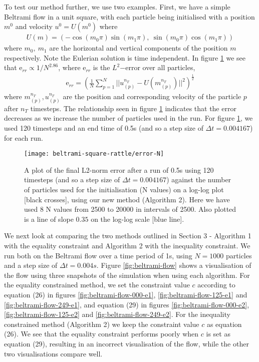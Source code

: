 \documentclass[11pt, oneside]{article}   	%
\newcommand{\dt}{\Delta t}
\begin{document}
To test our method further, we use two examples. First, we have a simple Beltrami flow in a unit square, with each particle being initialised with a position \(m^0\) and velocity \(u^0 = U(m^0)\) where
\begin{align}
U(m) = (-\cos(m_0 \pi) \sin(m_1 \pi), \: \sin(m_0 \pi) \cos(m_1 \pi))
\end{align}
where \(m_0, \: m_1\) are the horizontal and vertical components of the position \(m\) respectively. Note the Eulerian solution is time independent. In figure \ref{fig:error-N} we see that \(\text{e}_{rr} \propto 1/N^{2.86}\), where \(\text{e}_{rr}\) is the \(L^2\mathrm{-error}\) over all particles,
\begin{align}
\text{e}_{rr} = (\frac{1}{N} \sum_{p = 1}^{N} || u^{n_T}_{(p)} - U(m^{n_T}_{(p)}) ||^2)^\frac{1}{2}
\end{align}
where \(m^{n_T}_{(p)}, u^{n_T}_{(p)}\) are the position and corresponding velocity of the particle \(p\) after \(n_T\) timesteps. The relationship seen in figure \ref{fig:error-N} indicates that the error decreases as we increase the number of particles used in the run. For figure \ref{fig:error-N}, we used 120 timesteps and an end time of 0.5s (and so a step size of \(\dt = 0.004167\)) for each run. 

\begin{figure}[H]
\texttt{[image: beltrami-square-rattle/error-N]}
\centering
\caption{A plot of the final L2-norm error after a run of 0.5s using 120 timesteps (and so a step size of \(\dt = 0.004167\)) against the number of particles used for the initialisation (N values) on a log-log plot [black crosses], using our new method (Algorithm 2). Here we have used 8 N values from 2500 to 20000 in intervals of 2500. Also plotted is a line of slope \(0.35\) on the log-log scale [blue line].}
\centering
\label{fig:error-N}
\end{figure}

We next look at comparing the two methods outlined in Section 3 - Algorithm 1 with the equality constraint and Algorithm 2 with the inequality constraint. We run both on the Beltrami flow over a time period of 1s, using \(N = 1000\) particles and a step size of \(\dt = 0.004s\). Figure \ref{fig:beltrami-flow} shows a visualisation of the flow using three snapshots of the simulation when using each algorithm.  For the equality constrained method, we set the constraint value \(c\) according to equation (26) in figures \ref{fig:beltrami-flow-000-e1}, \ref{fig:beltrami-flow-125-e1} and \ref{fig:beltrami-flow-249-e1}, and equation (29) in figures \ref{fig:beltrami-flow-000-e2}, \ref{fig:beltrami-flow-125-e2} and \ref{fig:beltrami-flow-249-e2}. For the inequality constrained method (Algorithm 2) we keep the constraint value \(c\) as equation (26). We see that the equality constraint performs poorly when \(c\) is set as equation (29), resulting in an incorrect visualisation of the flow, while the other two visualisations compare well.
\end{document}
